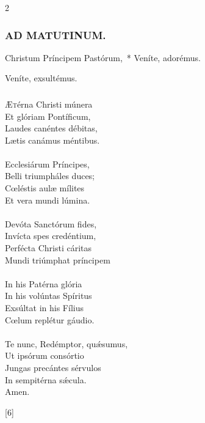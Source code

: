 \documentclass[9pt,twoside]{extarticle}
\begin{document}
\begin{multicols}{2}
\begin{tightlist}{}
\item {}
\end{tightlist}

\subsubsection*{\center \textsc{AD MATUTINUM.}}
\begin{tightlist}{}
\item {} Christum Príncipem Pastórum,~* Veníte, adorémus.
\item {} Veníte, exsultémus.
\end{tightlist}

\subsubsection*{\center {}}
\lettrine{Æ}térna Christi múnera\\
Et glóriam Pontíficum,\\
Laudes canéntes débitas,\\
Lætis canámus méntibus.\\
\\
Ecclesiárum Príncipes,\\
Belli triumpháles duces;\\
Cœléstis aulæ mílites\\
Et vera mundi lúmina.\\
\\
Devóta Sanctórum fides,\\
Invícta spes credéntium,\\
Perfécta Christi cáritas\\
Mundi triúmphat príncipem\\
\\
In his Patérna glória\\
In his volúntas Spíritus\\
Exsúltat in his Fílius\\
Cœlum replétur gáudio.\\
\\
Te nunc, Redémptor, quǽsumus,\\
Ut ipsórum consórtio\\
Jungas precántes sérvulos\\
In sempitérna sǽcula.\\
Amen.

\begin{tightlist}{}
\item {} [6]
\end{tightlist}


\end{multicols}
\end{document}
